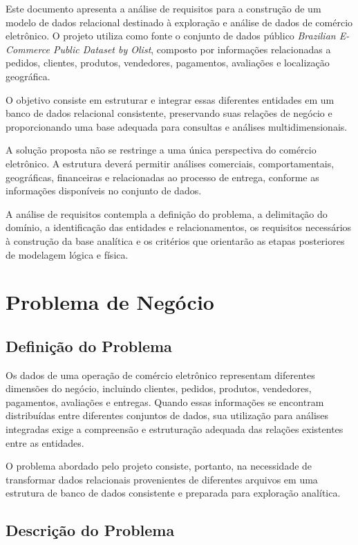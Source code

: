 \documentclass[12pt,a4paper]{article}
\begin{document}
Este documento apresenta a análise de requisitos para a construção de um modelo de dados relacional destinado à exploração e análise de dados de comércio eletrônico. O projeto utiliza como fonte o conjunto de dados público \textit{Brazilian E-Commerce Public Dataset by Olist}, composto por informações relacionadas a pedidos, clientes, produtos, vendedores, pagamentos, avaliações e localização geográfica.

O objetivo consiste em estruturar e integrar essas diferentes entidades em um banco de dados relacional consistente, preservando suas relações de negócio e proporcionando uma base adequada para consultas e análises multidimensionais.

A solução proposta não se restringe a uma única perspectiva do comércio eletrônico. A estrutura deverá permitir análises comerciais, comportamentais, geográficas, financeiras e relacionadas ao processo de entrega, conforme as informações disponíveis no conjunto de dados.

A análise de requisitos contempla a definição do problema, a delimitação do domínio, a identificação das entidades e relacionamentos, os requisitos necessários à construção da base analítica e os critérios que orientarão as etapas posteriores de modelagem lógica e física.

\section{Problema de Negócio}

\subsection{Definição do Problema}

Os dados de uma operação de comércio eletrônico representam diferentes dimensões do negócio, incluindo clientes, pedidos, produtos, vendedores, pagamentos, avaliações e entregas. Quando essas informações se encontram distribuídas entre diferentes conjuntos de dados, sua utilização para análises integradas exige a compreensão e estruturação adequada das relações existentes entre as entidades.

O problema abordado pelo projeto consiste, portanto, na necessidade de transformar dados relacionais provenientes de diferentes arquivos em uma estrutura de banco de dados consistente e preparada para exploração analítica.

\subsection{Descrição do Problema}
\end{document}
